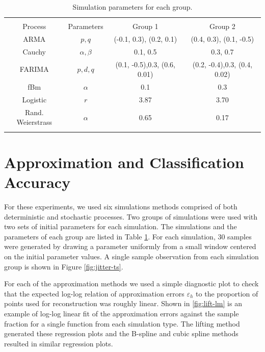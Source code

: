 \begin{table}[!htbp] \centering 
\begin{tabular}{@{\extracolsep{-6pt}} cccc} 
\\[-1.8ex]\hline 
\hline \\[-1.8ex] 
  Process  & Parameters  & Group 1 & Group 2  \\ \hline 
ARMA        & $p,q $  
            & (-0.1, 0.3), (0.2, 0.1)
            & (0.4, 0.3), (0.1, -0.5)     \\ 
Cauchy      & $\alpha, \beta$   
            & 0.1, 0.5   
            & 0.3, 0.7   \\ 
FARIMA      & $p,d,q$   
            &  (0.1, -0.5),0.3, (0.6, 0.01) 
            & (0.2, -0.4),0.3, (0.4, 0.02)  \\ 
fBm         & $\alpha$   
            & 0.1   
            & 0.3  \\ 
Logistic    & $r$       
            & 3.87   
            & 3.70 \\ 
Rand. Weierstrass &  $\alpha$  & 0.65  & 0.17  \\ 
\hline \\[-1.8ex] 
          \end{tabular} 
  \caption{Simulation parameters for each group.}
  \label{tab:sim-params}
\end{table}


\section{Approximation and Classification Accuracy}

For these experiments, we used six simulations methods comprised of both deterministic and stochastic processes. Two groups of simulations 
were used with two sets of initial parameters for each simulation. The simulations and the 
parameters of each group are listed in Table \ref{tab:sim-params}. 
For each simulation, 30 samples were generated by drawing 
a parameter uniformly from a small window centered on the initial
parameter values. A single sample observation from each simulation group is shown in Figure \ref{fig:jitter-ts}.

For each of the approximation methods we used a 
simple diagnostic plot to check that 
the expected log-log relation of approximation errors $\varepsilon_h$
to the proportion of points used for reconstruction was 
roughly linear. 
Shown in \ref{fig:lift-lm} is an example of log-log linear fit of the approximation errors against the sample fraction for a single function from each simulation type. The lifting method generated these regression plots and the B-spline and cubic spline methods 
resulted in similar regression plots. 


